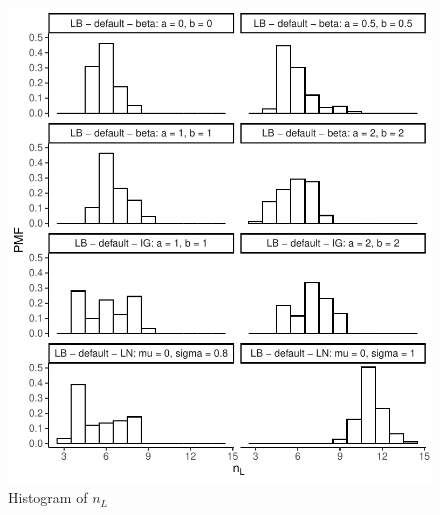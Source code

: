 \documentclass{amsart}
\begin{document}
\begin{figure}[ht]
	\centering
	\includegraphics[width=0.95\linewidth]{hist_nl_1.pdf}
	\caption{Histogram of $n_L$}
	\label{fig:hist:nl:1}
\end{figure}
\end{document}
